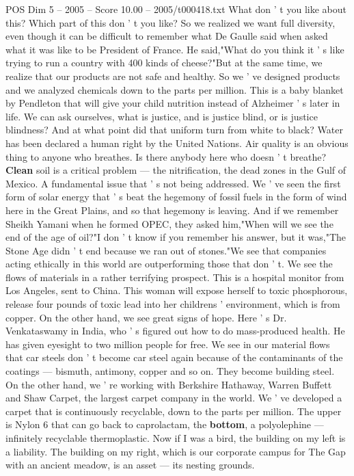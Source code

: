 \begin{textsample}{POS Dim 5 – 2005 – Score 10.00 – 2005/t000418.txt}
What don ' t you like about this?
Which part of this don ' t you like?
So we realized we want full diversity, even though it can be difficult to remember what De Gaulle said when asked what it was like to be President of France.
He said,"What do you think it ' s like trying to run a country with 400 kinds of cheese?"But at the same time, we realize that our products are not safe and healthy.
So we ' ve designed products and we analyzed chemicals down to the parts per million.
This is a baby blanket by Pendleton that will give your child nutrition instead of Alzheimer ' s later in life.
We can ask ourselves, what is justice, and is justice blind, or is justice blindness?
And at what point did that uniform turn from white to black?
Water has been declared a human right by the United Nations.
Air quality is an obvious thing to anyone who breathes.
Is there anybody here who doesn ' t breathe? \textbf{Clean} soil is a critical problem — the nitrification, the dead zones in the Gulf of Mexico.
A fundamental issue that ' s not being addressed.
We ' ve seen the first form of solar energy that ' s beat the hegemony of fossil fuels in the form of wind here in the Great Plains, and so that hegemony is leaving.
And if we remember Sheikh Yamani when he formed OPEC, they asked him,"When will we see the end of the age of oil?"I don ' t know if you remember his answer, but it was,"The Stone Age didn ' t end because we ran out of stones."We see that companies acting ethically in this world are outperforming those that don ' t.
We see the flows of materials in a rather terrifying prospect.
This is a hospital monitor from Los Angeles, sent to China.
This woman will expose herself to toxic phosphorous, release four pounds of toxic lead into her childrens ' environment, which is from copper.
On the other hand, we see great signs of hope.
Here ' s Dr.
Venkataswamy in India, who ' s figured out how to do mass-produced health.
He has given eyesight to two million people for free.
We see in our material flows that car steels don ' t become car steel again because of the contaminants of the coatings — bismuth, antimony, copper and so on.
They become building steel.
On the other hand, we ' re working with Berkshire Hathaway, Warren Buffett and Shaw Carpet, the largest carpet company in the world.
We ' ve developed a carpet that is continuously recyclable, down to the parts per million.
The upper is Nylon 6 that can go back to caprolactam, the \textbf{bottom}, a polyolephine — infinitely recyclable thermoplastic.
Now if I was a bird, the building on my left is a liability.
The building on my right, which is our corporate campus for The Gap with an ancient meadow, is an asset — its nesting grounds.

\end{textsample}

